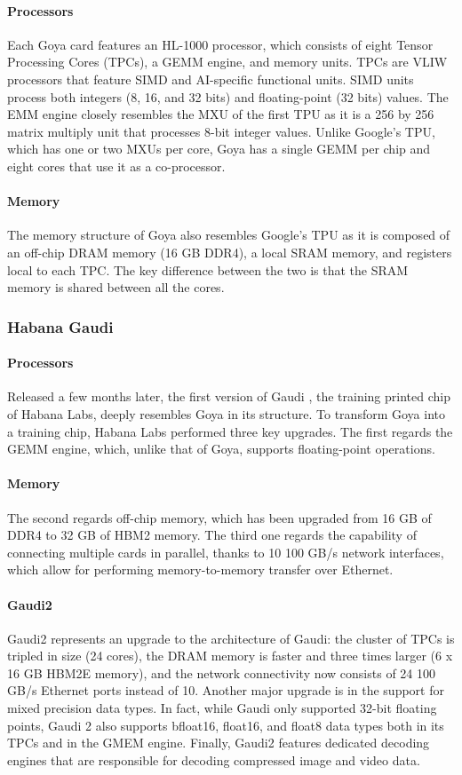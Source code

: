 \documentclass[conference]{IEEEtran}
\begin{document}
\paragraph{Processors}
Each Goya card features an HL-1000 processor, which consists of eight Tensor Processing Cores (TPCs), a GEMM engine, and memory units. TPCs are VLIW processors that feature SIMD and AI-specific functional units. SIMD units process both integers (8, 16, and 32 bits) and floating-point (32 bits) values. The  EMM engine closely resembles the MXU of the first TPU as it is a 256 by 256 matrix multiply unit that processes 8-bit integer values. Unlike Google's TPU, which has one or two MXUs per core, Goya has a single GEMM per chip and eight cores that use it as a co-processor.
\paragraph{Memory}
The memory structure of Goya also resembles Google's TPU as it is composed of an off-chip DRAM memory (16 GB DDR4), a local SRAM memory, and registers local to each TPC. The key difference between the two is that the SRAM memory is shared between all the cores.
\subsubsection{Habana Gaudi}
\paragraph{Processors}
Released a few months later, the first version of Gaudi \cite{Gwennap2019}, the training printed chip of Habana Labs, deeply resembles Goya in its structure. To transform Goya into a training chip, Habana Labs performed three key upgrades. The first regards the GEMM engine, which, unlike that of Goya, supports floating-point operations.
\paragraph{Memory} The second regards off-chip memory, which has been upgraded from 16 GB of DDR4 to 32 GB of HBM2 memory. The third one regards the capability of connecting multiple cards in parallel, thanks to 10 100 GB/s network interfaces, which allow for performing memory-to-memory transfer over Ethernet.
\paragraph{Gaudi2}
Gaudi2 \cite{gaudi2} represents an upgrade to the architecture of Gaudi: the cluster of TPCs is tripled in size (24 cores), the DRAM memory is faster and three times larger (6 x 16 GB HBM2E memory), and the network connectivity now consists of 24 100 GB/s Ethernet ports instead of 10. Another major upgrade is in the support for mixed precision data types. In fact, while Gaudi only supported 32-bit floating points, Gaudi 2 also supports bfloat16, float16, and float8 data types both in its TPCs and in the GMEM engine. Finally, Gaudi2 features dedicated decoding engines that are responsible for decoding compressed image and video data.
\end{document}
